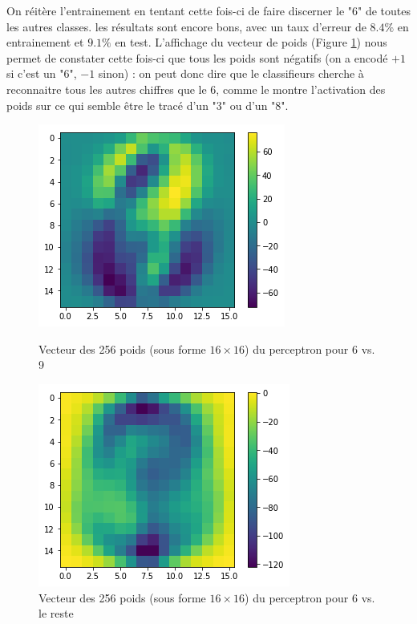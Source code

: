 \documentclass[a4paper]{article}
\begin{document}
On réitère l'entrainement en tentant cette fois-ci de faire discerner le "6" de toutes les autres classes. les résultats sont encore bons, avec un taux d'erreur de $8.4\%$ en entrainement et $9.1\%$ en test. L'affichage du vecteur de poids (Figure \ref{weights_mse_6vAll}) nous permet de constater cette fois-ci que tous les poids sont négatifs (on a encodé $+1$ si c'est un "6", $-1$ sinon) : on peut donc dire que le classifieurs cherche à reconnaitre tous les autres chiffres que le 6, comme le montre l'activation des poids sur ce qui semble être le tracé d'un "3" ou d'un "8".

\begin{figure}[ht!]
\begin{center}
\begin{minipage}{0.45\textwidth}
\includegraphics[scale=0.5]{weights_mse_6v9.png}
\caption{Vecteur des 256 poids (sous forme $16 \times 16$) du perceptron pour 6 vs. 9}
\label{weights_mse_6v9}
\end{minipage}\hfill
\begin{minipage}{0.45\textwidth}
\includegraphics[scale=0.5]{weights_mse_6vAll.png}
\caption{Vecteur des 256 poids (sous forme $16 \times 16$) du perceptron pour 6 vs. le reste}
\label{weights_mse_6vAll}
\end{minipage}
\end{center}
\end{figure}
\end{document}
